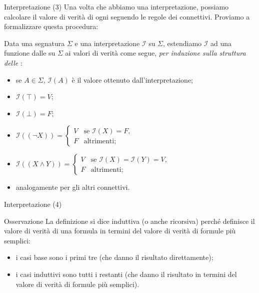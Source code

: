 \documentclass[aspectratio=169,10pt,dvipsnames,xcolor=table,handout]{beamer}
\newcommand{\mcI}{\mathcal{I}}
\begin{document}
\begin{frame}{Interpretazione (3)}
    Una volta che abbiamo una interpretazione, possiamo calcolare il valore di verità di ogni \fp seguendo le regole dei connettivi. Proviamo a formalizzare questa procedura:

    \begin{definition}
        Data una segnatura $\Sigma$ e una interpretazione $\mcI$ su $\Sigma$, estendiamo $\mcI$ ad una funzione dalle \fp su $\Sigma$ ai valori di verità come segue, \emph{per induzione sulla struttura delle \fp}:
        \begin{itemize}
            \item se $A \in \Sigma$, $\mcI(A)$ è il valore ottenuto dall'interpretazione;
            \item $\mcI(\top)=V$;
            \item $\mcI(\bot)=F$;
            \item $\mcI((\neg X))=\begin{cases}
                          V & \text{se $\mcI(X)=F$,} \\
                          F & \text{altrimenti;}
                      \end{cases}$
            \item $\mcI((X \wedge  Y))=\begin{cases}
                          V & \text{se $\mcI(X)=\mcI(Y)=V$,} \\
                          F & \text{altrimenti;}
                      \end{cases}$
            \item analogamente per gli altri connettivi.
        \end{itemize}
    \end{definition}
\end{frame}

\begin{frame}{Interpretazione (4)}
    \begin{block}{Osservazione}
        La definizione si dice \alert{induttiva} (o anche \alert{ricorsiva}) perché definisce il valore di verità di una formula in termini del valore di verità di formule più semplici:
        \begin{itemize}
            \item i casi base sono i primi tre (che danno il risultato direttamente);
            \item i casi induttivi sono tutti i restanti (che danno il risultato in termini del valore di verità di formule più semplici).
        \end{itemize}
    \end{block}
\end{frame}
\end{document}
